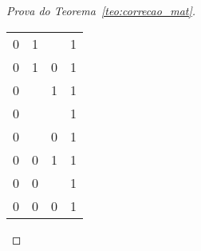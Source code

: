 \begin{proof}[Prova do Teorema~\ref{teo:correcao_mat}]
\begin{provaporcasos}
\begin{provaporsubcasos}
\begin{center}
\begin{longtable}{| C | C | C | C |}
                                0           & 1           & \meio{}     & 1 \\
                                0           & 1           & 0           & 1 \\
                                0           & \meio{}     & 1           & 1 \\
                                0           & \meio{}     & \meio{}     & 1 \\
                                0           & \meio{}     & 0           & 1 \\
                                0           & 0           & 1           & 1 \\
                                0           & 0           & \meio{}     & 1 \\
                                0           & 0           & 0           & 1 \\
                                \hline
                            \end{longtable}


\end{center}
\end{provaporsubcasos}
\end{provaporcasos}
\end{proof}
